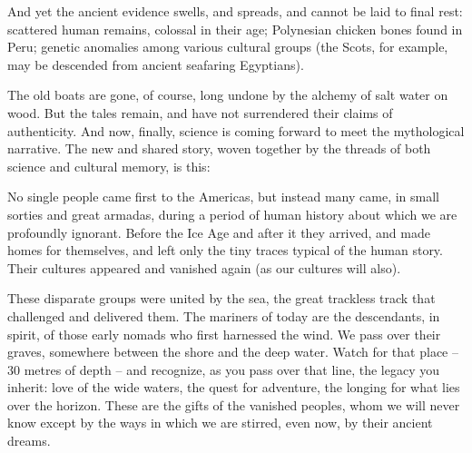 \documentclass[letterpaper,10pt,headsepline]{scrreprt}
\begin{document}
And yet the ancient evidence swells, and spreads, and cannot be laid
to final rest: scattered human remains, colossal in their age;
Polynesian chicken bones found in Peru; genetic anomalies among
various cultural groups (the Scots, for example, may be descended from
ancient seafaring Egyptians).

The old boats are gone, of course, long undone by the alchemy of salt
water on wood. But the tales remain, and have not surrendered their
claims of authenticity. And now, finally, science is coming forward to
meet the mythological narrative. The new and shared story, woven
together by the threads of both science and cultural memory, is this:

No single people came first to the Americas, but instead many came, in
small sorties and great armadas, during a period of human history
about which we are profoundly ignorant. Before the Ice Age and after
it they arrived, and made homes for themselves, and left only the tiny
traces typical of the human story. Their cultures appeared and
vanished again (as our cultures will also).

These disparate groups were united by the sea, the great trackless
track that challenged and delivered them. The mariners of today are
the descendants, in spirit, of those early nomads who first harnessed
the wind. We pass over their graves, somewhere between the shore and
the deep water. Watch for that place -- 30 metres of depth -- and
recognize, as you pass over that line, the legacy you inherit: love of
the wide waters, the quest for adventure, the longing for what lies
over the horizon. These are the gifts of the vanished peoples, whom we
will never know except by the ways in which we are stirred, even now,
by their ancient dreams.
\end{document}

